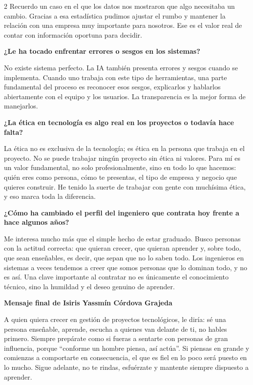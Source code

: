 \documentclass[10pt,spanish,Letterpaper,openany]{book}
\let\origtextbf\textbf
\renewcommand{\textbf}[1]{{\color{textlinetitle}\origtextbf{#1}}}
\begin{document}
\begin {multicols}{2}
Recuerdo un caso en el que los datos nos mostraron que algo necesitaba un cambio. Gracias a esa estadística pudimos ajustar el rumbo y mantener la relación con una empresa muy importante para nosotros. Ese es el valor real de contar con información oportuna para decidir.

\textbf{¿Le ha tocado enfrentar errores o sesgos en los sistemas?}

No existe sistema perfecto. La IA también presenta errores y sesgos cuando se implementa. Cuando uno trabaja con este tipo de herramientas, una parte fundamental del proceso es reconocer esos sesgos, explicarlos y hablarlos abiertamente con el equipo y los usuarios. La transparencia es la mejor forma de manejarlos.

\textbf{¿La ética en tecnología es algo real en los proyectos o todavía hace falta?}

La ética no es exclusiva de la tecnología; es ética en la persona que trabaja en el proyecto. No se puede trabajar ningún proyecto sin ética ni valores. Para mí es un valor fundamental, no solo profesionalmente, sino en todo lo que hacemos: quién eres como persona, cómo te presentas, el tipo de empresa y negocio que quieres construir. He tenido la suerte de trabajar con gente con muchísima ética, y eso marca toda la diferencia.

\textbf{¿Cómo ha cambiado el perfil del ingeniero que contrata hoy frente a hace algunos años?}

Me interesa mucho más que el simple hecho de estar graduado. Busco personas con la actitud correcta: que quieran crecer, que quieran aprender y, sobre todo, que sean enseñables, es decir, que sepan que no lo saben todo. Los ingenieros en sistemas a veces tendemos a creer que somos personas que lo dominan todo, y no es así. Una clave importante al contratar no es únicamente el conocimiento técnico, sino la humildad y el deseo genuino de aprender.

\textbf{Mensaje final de Isiris Yassmín Córdova Grajeda}

A quien quiera crecer en gestión de proyectos tecnológicos, le diría: sé una persona enseñable, aprende, escucha a quienes van delante de ti, no hables primero. Siempre prepárate como si fueras a sentarte con personas de gran influencia, porque ``conforme un hombre piensa, así actúa''. Si piensas en grande y comienzas a comportarte en consecuencia, el que es fiel en lo poco será puesto en lo mucho. Sigue adelante, no te rindas, esfuérzate y mantente siempre dispuesto a aprender.

\end {multicols}
\end{document}
